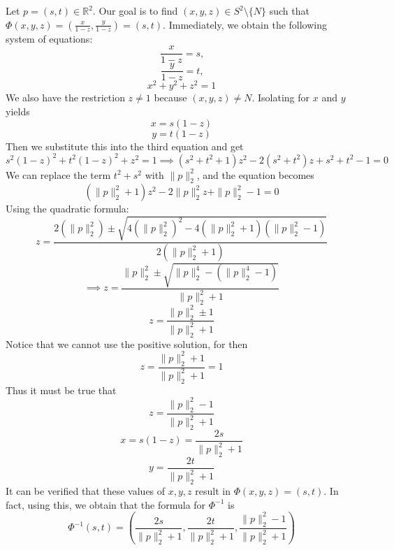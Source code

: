 \documentclass{article}
\theoremstyle{plain} %
\numberwithin{thm}{section} %
\theoremstyle{definition}
\begin{document}
\begin{question}{23}
        Let \(p = (s,t) \in \mathbb{R}^2\). Our goal is to find \((x,y,z) \in S^2 \setminus \{N\}\) such that \(\Phi (x,y,z) = \left( \frac{x}{1-z}, \frac{y}{1-z} \right) = (s,t)\). Immediately, we obtain the following system of equations:
        \[
            \frac{x}{1-z} = s \text{,} 
        \]
        \[
            \frac{y}{1-z} = t \text{,} 
        \]
        \[
            x^2 + y^2 + z^2 = 1
        \]
        We also have the restriction \(z\neq 1\) because \((x,y,z) \neq N\). Isolating for \(x\) and \(y\) yields
        \[
            x=s(1-z)
        \]
        \[
            y=t(1-z)
        \]
        Then we substitute this into the third equation and get
        \[
            s^2(1-z)^2 + t^2(1-z)^2 + z^2 = 1 \implies (s^2 + t^2 + 1)z^2 - 2(s^2 + t^2)z + s^2 + t^2 - 1 = 0
        \]
        We can replace the term \(t^2 + s^2\) with \(\|p\| _2 ^2\), and the equation becomes
        \[
            (\|p\| _2 ^2 + 1)z^2 - 2\|p\| _2 ^2 z + \|p\| _2 ^2 - 1 = 0
        \]
        Using the quadratic formula:
        \[
            z = \frac{2(\|p\| _2 ^2) \pm \sqrt{4(\|p\| _2 ^2)^2 - 4(\|p\| _2 ^2 +1)(\|p\| _2 ^2 - 1)}}{2(\|p\| _2 ^2 + 1)}
        \]
        \[
            \implies z = \frac{\|p\| _2 ^2 \pm \sqrt{\|p\| _2 ^4 - (\|p\| _2 ^4 - 1)}}{\|p\| _2 ^2 + 1}
        \]
        \[
            z = \frac{\|p\| _2 ^2 \pm 1}{\|p\| _2 ^2 + 1}
        \]
        Notice that we cannot use the positive solution, for then
        \[
            z = \frac{\|p\| _2 ^2 + 1}{\|p\| _2 ^2 + 1} = 1
        \]
        Thus it must be true that
        \[
            z = \frac{\|p\| _2 ^2 - 1}{\|p\| _2 ^2 + 1}
        \]
        \[
            x = s(1-z) = \frac{2s}{\|p\| _2 ^2 + 1}
        \]
        \[
            y = \frac{2t}{\|p\| _2 ^2 + 1}
        \]
        It can be verified that these values of \(x,y,z\) result in \(\Phi (x,y,z) = (s,t)\). In fact, using this, we obtain that the formula for \(\Phi ^{-1}\) is
        \[
            \Phi ^{-1} (s,t) = \left(\frac{2s}{\|p\| _2 ^2 + 1}, \frac{2t}{\|p\| _2 ^2 + 1}, \frac{\|p\| _2 ^2 - 1}{\|p\| _2 ^2 + 1}\right)
        \]
    \end{question}
    \pagebreak
\end{document}
